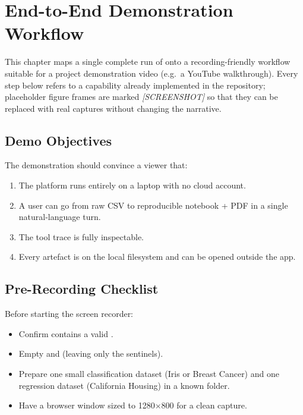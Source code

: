 \chapter{End-to-End Demonstration Workflow}
\label{ch:demo}

This chapter maps a single complete run of \projname{} onto a
recording-friendly workflow suitable for a project demonstration
video (e.g.\ a YouTube walkthrough). Every step below refers to a
capability already implemented in the repository; placeholder figure
frames are marked \emph{[SCREENSHOT]} so that they can be replaced
with real captures without changing the narrative.

\section{Demo Objectives}
\label{sec:demo-obj}

The demonstration should convince a viewer that:

\begin{enumerate}[leftmargin=1.4em]
  \item The platform runs entirely on a laptop with no cloud
        account.
  \item A user can go from raw CSV to reproducible notebook + PDF
        in a single natural-language turn.
  \item The tool trace is fully inspectable.
  \item Every artefact is on the local filesystem and can be opened
        outside the app.
\end{enumerate}

\section{Pre-Recording Checklist}
\label{sec:pre-record}

Before starting the screen recorder:

\begin{itemize}[leftmargin=1.4em]
  \item Confirm  contains a valid .
  \item Empty  and 
        (leaving only the  sentinels).
  \item Prepare one small classification dataset (Iris or Breast
        Cancer) and one regression dataset (California Housing) in a
        known folder.
  \item Have a browser window sized to 1280$\times$800 for a clean
        capture.
\end{itemize}


